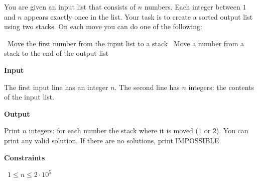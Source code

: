You are given an input list that consists of $n$ numbers. Each integer between $1$ and $n$ appears exactly once in the list.
Your task is to create a sorted output list using two stacks. On each move you can do one of the following:

\textbullet\ Move the first number from the input list to a stack
\textbullet\ Move a number from a stack to the end of the output list

\vspace{0.3cm}\noindent\textbf{Input}

The first input line has an integer $n$.
The second line has $n$ integers: the contents of the input list.

\vspace{0.3cm}\noindent\textbf{Output}

Print $n$ integers: for each number the stack where it is moved ($1$ or $2$).
You can print any valid solution. If there are no solutions, print IMPOSSIBLE.

\vspace{0.3cm}\noindent\textbf{Constraints}

\textbullet\ $1 \le n \le 2 \cdot 10^5$